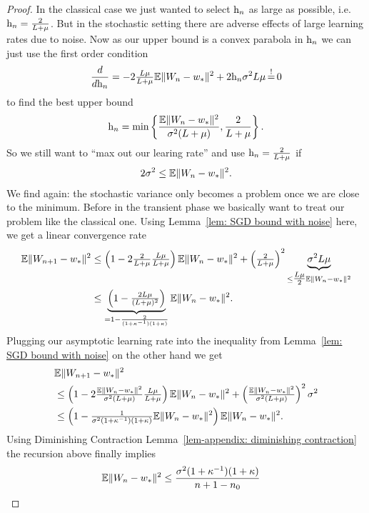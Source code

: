 \begin{proof}
	In the classical case we just wanted to select \(\text{h}_n\) as large as possible,
	i.e. \(\text{h}_n=\tfrac{2}{L+\mu}\). But in the stochastic setting there
	are adverse effects of large learning rates due to noise. Now as our upper bound
	is a convex parabola in \(\text{h}_n\) we can just use the first order condition
	\begin{align*}
		\frac{d}{d\lr_n}
		= -2\tfrac{\ubound\lbound}{\ubound+\lbound}
		\E\|\Weights_n - \minimum\|^2 + 2\lr_n \stdBound^2\ubound\lbound
		\xeq{!} 0
	\end{align*}
	to find the best upper bound
	\begin{align}\label{eq: optimal learning rate SGD}
		\text{h}_n
		= \min\left\{
			\frac{\mathbb{E}\|W_n - w_*\|^2}{\sigma^2(L+\mu)},
			\frac{2}{L+\mu}
		\right\}.
	\end{align}
	So we still want to ``max out our learing rate'' and use
	\(\text{h}_n=\tfrac{2}{L+\mu}\) if
	\begin{align*}
		2\sigma^2 \le \mathbb{E}\|W_n - w_*\|^2.
	\end{align*}
	We find again: the stochastic variance only becomes a problem once we are
	close to the minimum. Before in the transient phase we basically want to
	treat our problem like the classical one. Using Lemma~\ref{lem: SGD bound
	with noise} here, we get a linear convergence rate
	\begin{align*}
		\mathbb{E}\|W_{n+1} - w_*\|^2
		&\le \left(1-2\tfrac{2}{L+\mu}\tfrac{L\mu}{L+\mu}\right)
		\mathbb{E}\|W_n - w_*\|^2 + \left(\tfrac{2}{L+\mu}\right)^2
		\underbrace{\sigma^2L\mu}_{
			\le\tfrac{L\mu}{2} \mathbb{E}\|W_n - w_*\|^2
		}\\
		&\le \underbrace{
			\left(1-\tfrac{2L\mu}{(L+\mu)^2}\right)
		}_{
			=1-\frac{2}{(1+\kappa^{-1})(1+\kappa)}
		}
		\mathbb{E}\|W_n - w_*\|^2.
	\end{align*}
	Plugging our asymptotic learning rate into the inequality from Lemma~\ref{lem: SGD bound with noise}
	on the other hand we get
	\begin{align*}
		&\mathbb{E}\|W_{n+1} - w_*\|^2\\
		&\le \left(1-2
			\tfrac{\mathbb{E}\|W_n - w_*\|^2}{\sigma^2(L+\mu)}
			\tfrac{L\mu}{L+\mu}
		\right)
		\mathbb{E}\|W_n - w_*\|^2
		+ \left(
			\tfrac{\mathbb{E}\|W_n - w_*\|^2}{\sigma^2(L+\mu)}
		\right)^2
		\sigma^2\\
		&\le \left(1-
			\tfrac{1}{\sigma^2(1+\kappa^{-1})(1+\kappa)}
			\mathbb{E}\|W_n - w_*\|^2
		\right)
		\mathbb{E}\|W_n - w_*\|^2.
	\end{align*}
	Using Diminishing Contraction Lemma~\ref{lem-appendix: diminishing
	contraction} the recursion above finally implies
	\begin{align*}
		\mathbb{E}\|W_n - w_*\|^2
		&\le \frac{\sigma^2(1+\kappa^{-1})(1+\kappa)}{n+1-n_0}
		\qedhere
	\end{align*}
\end{proof}

